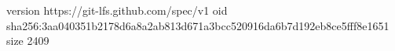 version https://git-lfs.github.com/spec/v1
oid sha256:3aa040351b2178d6a8a2ab813d671a3bcc520916da6b7d192eb8ce5fff8e1651
size 2409
